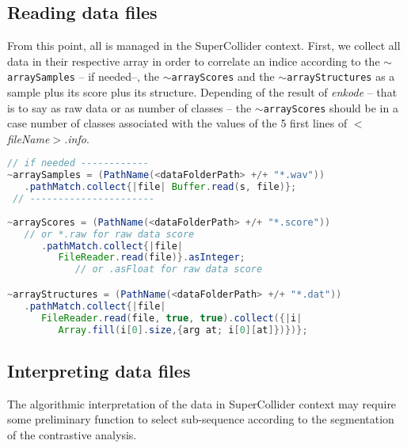 \subsection{Reading data files}
\label{rdf}

From this point, all is managed in the SuperCollider context.
First, we collect all data in their respective array in order to correlate an indice according to the \texttt{$\sim$arraySamples} -- if needed--, the \texttt{$\sim$arrayScores} and the \texttt{$\sim$arrayStructures} as a sample plus its score plus its structure. Depending of the result of \textsl{enkode} -- that is to say as raw data or as number of classes -- the \texttt{$\sim$arrayScores} should be in a case number of classes associated with the values of the 5 first lines of \textsl{$<$fileName$>$.info}.

\smallskip

 \begin{lstlisting}[basicstyle=\footnotesize\ttfamily,language=Java] 
 // if needed ------------
~arraySamples = (PathName(<dataFolderPath> +/+ "*.wav"))
   .pathMatch.collect{|file| Buffer.read(s, file)};
 // ----------------------
 
~arrayScores = (PathName(<dataFolderPath> +/+ "*.score"))
   // or *.raw for raw data score
      .pathMatch.collect{|file| 
         FileReader.read(file)}.asInteger; 
            // or .asFloat for raw data score

~arrayStructures = (PathName(<dataFolderPath> +/+ "*.dat"))
   .pathMatch.collect{|file| 
      FileReader.read(file, true, true).collect({|i| 
         Array.fill(i[0].size,{arg at; i[0][at]})})};
\end{lstlisting}  

\subsection{Interpreting data files}
\label{idf}

The algorithmic interpretation of the data in SuperCollider context may require some preliminary function to select sub-sequence according to the segmentation of the contrastive analysis. 

